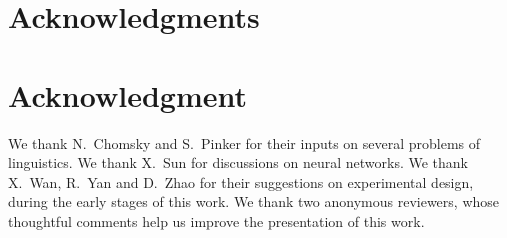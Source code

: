 \documentclass[10pt,journal,compsoc]{IEEEtran}
\begin{document}
  \section*{Acknowledgments}
\else
  \section*{Acknowledgment}
\fi


We thank N.\ Chomsky and S.\ Pinker for their inputs on several problems of linguistics. We thank X.\ Sun for  discussions on neural networks. We thank X.\ Wan, R.\ Yan and D.\ Zhao for their suggestions on experimental design, during the early stages of this work. We thank two anonymous reviewers, whose thoughtful comments help us improve the presentation of this work.


\ifCLASSOPTIONcaptionsoff
  \newpage
\fi




\end{document}
